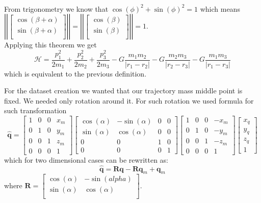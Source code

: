 \begin{itemize}
\begin{eqnarray*}
\end{eqnarray*}
From trigonometry we know that $\cos(\phi)^2 + \sin(\phi)^2= 1 $ which means $\left|\left|\begin{bmatrix}
	\cos(\beta + \alpha)\\
	\sin(\beta + \alpha)\\
\end{bmatrix}\right|\right| =\left|\left|\begin{bmatrix}
\cos(\beta)\\
\sin(\beta)\\
\end{bmatrix}\right|\right|= 1$.\\
Applying this theorem we get 
\begin{equation}
	\mathcal{H} = \frac{p_1^2}{2m_1} +\frac{p_2^2}{2m_2}+\frac{p_3^2}{2m_3} - G\frac{m_1m_2}{|r_1 - r_2|}-G\frac{m_2m_3}{|r_2 - r_3|}-G\frac{m_1m_3}{|r_1 - r_3|}
\end{equation} which is equivalent to the previous definition.
\end{itemize}
For the dataset creation we wanted that our trajectory mass middle point is fixed. We needed only rotation around it.
For such rotation we used formula for such transformation
\begin{equation}
	\hat{\mathbf{q}} = 
	\begin{bmatrix}
		1 & 0 & 0 & x_m\\
		0 & 1 & 0 & y_m\\
		0 & 0 & 1 & z_m\\
		0 & 0 & 0 & 1
	\end{bmatrix}	
\begin{bmatrix}
	\cos(\alpha) & -\sin(\alpha) & 0 & 0\\
	\sin(\alpha) & \cos(\alpha) & 0 & 0\\
	0 & 0 & 1 & 0\\
	0 & 0 & 0 & 1
\end{bmatrix}
\begin{bmatrix}
	1 & 0 & 0 & -x_m\\
	0 & 1 & 0 & -y_m\\
	0 & 0 & 1 & -z_m\\
	0 & 0 & 0 & 1
\end{bmatrix}
\begin{bmatrix}
	x_q\\
	y_q\\
	z_q\\
	1
\end{bmatrix}
\end{equation} which for two dimensional cases can be rewritten as:
\begin{equation}
	\hat{\mathbf{q}} = \mathbf{R}\mathbf{q} - \mathbf{R}\mathbf{q}_m + \mathbf{q}_m
\end{equation} where $\mathbf{R}=\begin{bmatrix}
\cos(\alpha) & -\sin(alpha)\\
\sin(\alpha) & \cos(\alpha)\\
\end{bmatrix}$.

